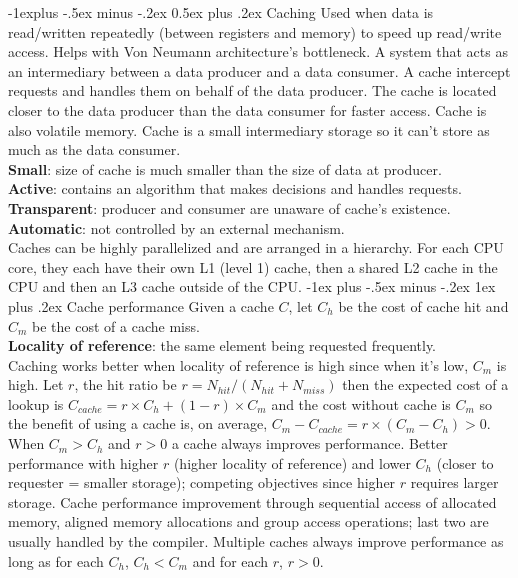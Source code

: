 \documentclass[10pt,landscape]{article}
\makeatletter
\renewcommand{\subsection}{\@startsection{subsection}{2}{0mm}%
                                {-1explus -.5ex minus -.2ex}%
                                {0.5ex plus .2ex}%
                                {\normalfont\scriptsize\bfseries}}
\renewcommand{\subsubsection}{\@startsection{subsubsection}{3}{0mm}%
                                {-1ex plus -.5ex minus -.2ex}%
                                {1ex plus .2ex}%
                                {\normalfont\scriptsize\bfseries}}
\makeatother
\begin{document}
\begin{multicols}{3}
\subsection{Caching}
Used when data is read/written repeatedly (between registers and memory) to speed up read/write access. Helps with Von Neumann architecture's bottleneck. A system that acts as an intermediary between a data producer and a data consumer. A cache intercept requests and handles them on behalf of the data producer. The cache is located closer to the data producer than the data consumer for faster access. Cache is also volatile memory. Cache is a small intermediary storage so it can't store as much as the data consumer.\\
\textbf{Small}: size of cache is much smaller than the size of data at producer.\\
\textbf{Active}: contains an algorithm that makes decisions and handles requests.\\
\textbf{Transparent}: producer and consumer are unaware of cache's existence.\\
\textbf{Automatic}: not controlled by an external mechanism.\\
Caches can be highly parallelized and are arranged in a hierarchy. For each CPU core, they each have their own L1 (level 1) cache, then a shared L2 cache in the CPU and then an L3 cache outside of the CPU. 
\subsubsection{Cache performance}
Given a cache $C$, let $C_h$ be the cost of cache hit and $C_m$ be the cost of a cache miss.\\ 
\textbf{Locality of reference}: the same element being requested frequently.\\
Caching works better when locality of reference is high since when it's low, $C_m$ is high. Let $r$, the hit ratio be $r=N_{hit} / (N_{hit} + N_{miss})$ then the expected cost of a lookup is $C_{cache}=r\times C_h+(1-r)\times C_m$ and the cost without cache is $C_m$ so the benefit of using a cache is, on average, $C_m-C_{cache}=r\times (C_m-C_h) > 0$. When $C_m > C_h$ and $r>0$ a cache always improves performance. Better performance with higher $r$ (higher locality of reference) and lower $C_h$ (closer to requester = smaller storage); competing objectives since higher $r$ requires larger storage. Cache performance improvement through sequential access of allocated memory, aligned memory allocations and group access operations; last two are usually handled by the compiler. Multiple caches always improve performance as long as for each $C_h$, $C_h<C_m$ and for each $r$, $r > 0$. 

\end{multicols}
\end{document}
